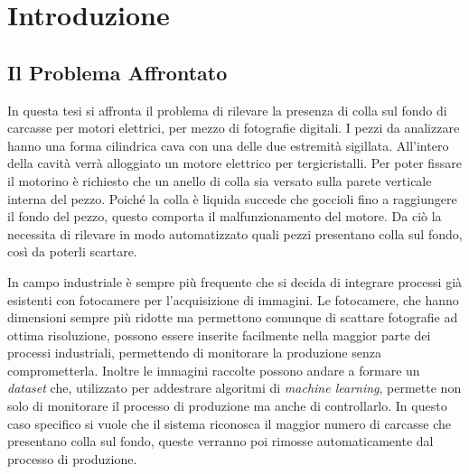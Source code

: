 
\chapter{Introduzione}

\section{Il Problema Affrontato}
In questa tesi si affronta il problema di rilevare la presenza di colla sul fondo di carcasse per motori elettrici, per mezzo di fotografie digitali.
I pezzi da analizzare hanno una forma cilindrica cava con una delle due estremità sigillata.
All'intero della cavità verrà alloggiato un motore elettrico per tergicristalli.
Per poter fissare il motorino è richiesto che un anello di colla sia versato sulla parete verticale interna del pezzo.
Poiché la colla è liquida succede che goccioli fino a raggiungere il fondo del pezzo, questo comporta il malfunzionamento del motore.
Da ciò la necessita di rilevare in modo automatizzato quali pezzi presentano colla sul fondo, così da poterli scartare.

In campo industriale è sempre più frequente che si decida di integrare processi già esistenti con fotocamere per l'acquisizione di immagini.
Le fotocamere, che hanno dimensioni sempre più ridotte ma permettono comunque di scattare fotografie ad ottima risoluzione, possono essere inserite facilmente nella maggior parte dei processi industriali, permettendo di monitorare la produzione senza comprometterla.
Inoltre le immagini raccolte possono andare a formare un \textit{dataset} che, utilizzato per addestrare algoritmi di \textit{machine learning}, permette non solo di monitorare il processo di produzione ma anche di controllarlo.
In questo caso specifico si vuole che il sistema riconosca il maggior numero di carcasse che presentano colla sul fondo, queste verranno poi rimosse automaticamente dal processo di produzione.

